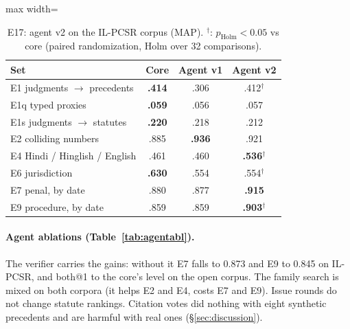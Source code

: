 \documentclass[sigconf,nonacm]{acmart}
\newcommand{\ph}{p_{\text{Holm}}}
\begin{document}
\begin{table}[t]
\centering\small
\caption{E17: agent v2 on the IL-PCSR corpus (MAP). $^\dagger$: $\ph<0.05$ vs core (paired
randomization, Holm over 32 comparisons).}
\label{tab:agent}
\begin{adjustbox}{max width=\linewidth}
\begin{tabular}{lccc}
\toprule
Set & Core & Agent v1 & Agent v2 \\
\midrule
E1 judgments $\to$ precedents & \textbf{.414} & .306 & .412$^\dagger$ \\
E1q typed proxies & \textbf{.059} & .056 & .057 \\
E1s judgments $\to$ statutes & \textbf{.220} & .218 & .212 \\
E2 colliding numbers & .885 & \textbf{.936} & .921 \\
E4 Hindi / Hinglish / English & .461 & .460 & \textbf{.536}$^\dagger$ \\
E6 jurisdiction & \textbf{.630} & .554 & .554$^\dagger$ \\
E7 penal, by date & .880 & .877 & \textbf{.915} \\
E9 procedure, by date & .859 & .859 & \textbf{.903}$^\dagger$ \\
\bottomrule
\end{tabular}
\end{adjustbox}
\end{table}

\paragraph{Agent ablations (Table~\ref{tab:agentabl}).} The verifier carries the gains: without it
E7 falls to 0.873 and E9 to 0.845 on IL-PCSR, and both@1 to the core's level on the open corpus.
The family search is mixed on both corpora (it helps E2 and E4, costs E7 and E9). Issue rounds do
not change statute rankings. Citation votes did nothing with eight synthetic precedents and are
harmful with real ones (\S\ref{sec:discussion}).
\end{document}

